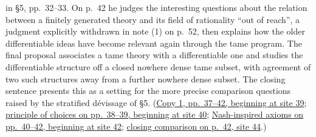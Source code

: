 \documentclass[11pt,a4paper]{article}
\begin{document}
in \S5, pp.~32--33. On p.~42 he judges the interesting questions about
the relation between a finitely generated theory and its field of
rationality ``out of reach'', a judgment explicitly withdrawn in note (1)
on p.~52, then explains how the older differentiable
ideas have become relevant again through the tame program. The final
proposal associates a tame theory with a differentiable one and studies
the differentiable structure off a closed nowhere dense tame subset,
with agreement of two such structures away from a further nowhere dense
subset. The closing sentence presents this as a setting for the more
precise comparison questions raised by the stratified dévissage of \S5.
(\href{https://grothendieck.umontpellier.fr/web/viewer.html?file=../119.pdf\#page=40}{Copy 1, pp.~37--42, beginning at site 39};
\href{https://grothendieck.umontpellier.fr/web/viewer.html?file=../119.pdf\#page=41}{principle of choices on pp.~38--39, beginning at site 40};
\href{https://grothendieck.umontpellier.fr/web/viewer.html?file=../119.pdf\#page=43}{Nash-inspired axioms on pp.~40--42, beginning at site 42};
\href{https://grothendieck.umontpellier.fr/web/viewer.html?file=../119.pdf\#page=45}{closing comparison on p.~42, site 44}.)
\end{document}
